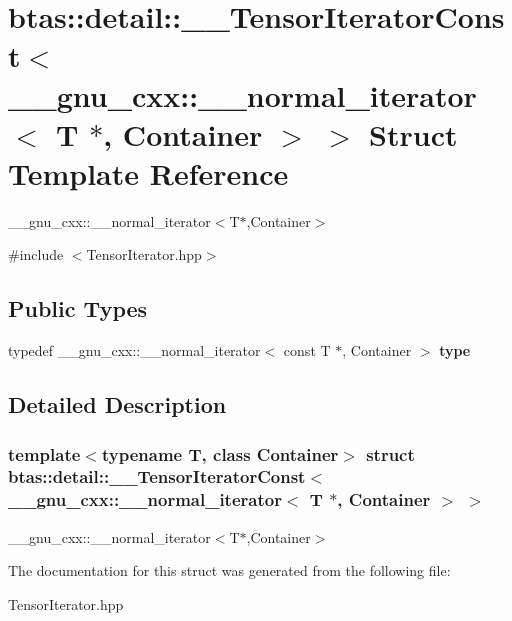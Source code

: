 \hypertarget{structbtas_1_1detail_1_1_____tensor_iterator_const_3_01____gnu__cxx_1_1____normal__iterator_3_01d7c6a6a71b679ddebb1a890aa588b8e2}{
\section{btas::detail::\_\-\_\-TensorIteratorConst$<$ \_\-\_\-gnu\_\-cxx::\_\-\_\-normal\_\-iterator$<$ T $\ast$, Container $>$ $>$ Struct Template Reference}
\label{structbtas_1_1detail_1_1_____tensor_iterator_const_3_01____gnu__cxx_1_1____normal__iterator_3_01d7c6a6a71b679ddebb1a890aa588b8e2}
}


\_\-\_\-gnu\_\-cxx::\_\-\_\-normal\_\-iterator$<$T$\ast$,Container$>$  


{\ttfamily \#include $<$TensorIterator.hpp$>$}\subsection*{Public Types}
\begin{DoxyCompactItemize}
\item 
\hypertarget{structbtas_1_1detail_1_1_____tensor_iterator_const_3_01____gnu__cxx_1_1____normal__iterator_3_01d7c6a6a71b679ddebb1a890aa588b8e2_a4a666a06a377ce94aeb70121db335289}{
typedef \_\-\_\-gnu\_\-cxx::\_\-\_\-normal\_\-iterator$<$ const T $\ast$, Container $>$ {\bfseries type}}
\label{structbtas_1_1detail_1_1_____tensor_iterator_const_3_01____gnu__cxx_1_1____normal__iterator_3_01d7c6a6a71b679ddebb1a890aa588b8e2_a4a666a06a377ce94aeb70121db335289}

\end{DoxyCompactItemize}


\subsection{Detailed Description}
\subsubsection*{template$<$typename T, class Container$>$ struct btas::detail::\_\-\_\-TensorIteratorConst$<$ \_\-\_\-gnu\_\-cxx::\_\-\_\-normal\_\-iterator$<$ T $\ast$, Container $>$ $>$}

\_\-\_\-gnu\_\-cxx::\_\-\_\-normal\_\-iterator$<$T$\ast$,Container$>$ 

The documentation for this struct was generated from the following file:\begin{DoxyCompactItemize}
\item 
TensorIterator.hpp\end{DoxyCompactItemize}
